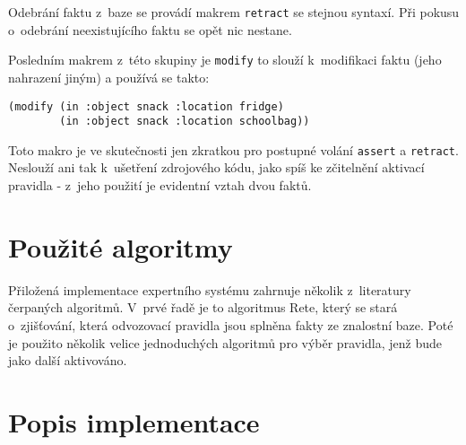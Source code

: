 \documentclass[a4paper,12pt]{article}
\begin{document}
Odebrání faktu z~baze se provádí makrem \verb|retract| se stejnou syntaxí.
Při pokusu o~odebrání neexistujícího faktu se opět nic nestane.

Posledním makrem z~této skupiny je \verb|modify| to slouží k~modifikaci
faktu (jeho nahrazení jiným) a používá se takto:
\begin{verbatim}
(modify (in :object snack :location fridge)
        (in :object snack :location schoolbag))
\end{verbatim}
Toto makro je ve skutečnosti jen zkratkou pro postupné volání \verb|assert|
a \verb|retract|. Neslouží ani tak k~ušetření zdrojového kódu, jako spíš
ke zčitelnění aktivací pravidla - z~jeho použití je evidentní vztah dvou
faktů.

\newpage

\section{Použité algoritmy}
Přiložená implementace expertního systému zahrnuje několik z~literatury
čerpaných algoritmů. V~prvé řadě je to algoritmus Rete, který se stará
o~zjišťování, která odvozovací pravidla jsou splněna fakty ze znalostní
baze. Poté je použito několik velice jednoduchých algoritmů pro výběr
pravidla, jenž bude jako další aktivováno. 

\newpage

\section{Popis implementace}
\end{document}
